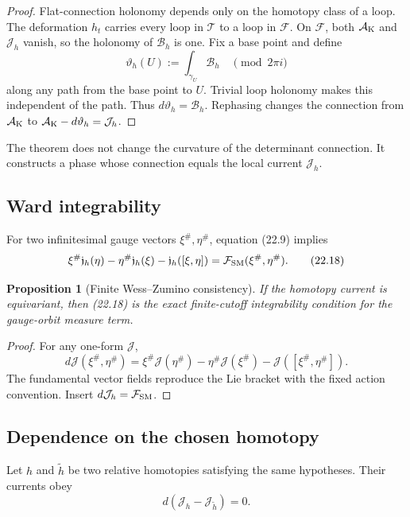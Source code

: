 \documentclass[11pt]{article}
\newtheorem{proposition}[theorem]{Proposition}
\begin{document}
\begin{proof}
Flat-connection holonomy depends only on the homotopy class of a loop.
The deformation \(h_t\) carries every loop in \(\mathcal T\) to a loop in
\(\mathcal F\).  On \(\mathcal F\), both
\(\mathcal A_{\rm K}\) and \(\mathcal J_h\) vanish, so the holonomy of
\(\mathcal B_h\) is one.  Fix a base point and define
\[
 \vartheta_h(U):=\int_{\gamma_U}\mathcal B_h
 \quad\pmod{2\pi i}
\]
along any path from the base point to \(U\).  Trivial loop holonomy makes
this independent of the path.  Thus \(d\vartheta_h=\mathcal B_h\).
Rephasing changes the connection from
\(\mathcal A_{\rm K}\) to
\(\mathcal A_{\rm K}-d\vartheta_h=\mathcal J_h\).
\end{proof}

The theorem does not change the curvature of the determinant connection.
It constructs a phase whose connection equals the local current
\(\mathcal J_h\).

\subsection{Ward integrability}

For two infinitesimal gauge vectors \(\xi^\#,\eta^\#\), equation (22.9)
implies
\[
 \xi^\#\mathfrak j_h(\eta)
 -\eta^\#\mathfrak j_h(\xi)
 -\mathfrak j_h([\xi,\eta])
 =
 \mathcal F_{\rm SM}(\xi^\#,\eta^\#).
 \tag{22.18}
\]

\begin{proposition}[Finite Wess--Zumino consistency]
\label{prop:v11v22-consistency}
If the homotopy current is equivariant, then (22.18) is the exact
finite-cutoff integrability condition for the gauge-orbit measure term.
\end{proposition}

\begin{proof}
For any one-form \(\mathcal J\),
\[
 d\mathcal J(\xi^\#,\eta^\#)
 =
 \xi^\#\mathcal J(\eta^\#)
 -\eta^\#\mathcal J(\xi^\#)
 -\mathcal J([\xi^\#,\eta^\#]).
\]
The fundamental vector fields reproduce the Lie bracket with the fixed
action convention.  Insert \(d\mathcal J_h=\mathcal F_{\rm SM}\).
\end{proof}

\subsection{Dependence on the chosen homotopy}

Let \(h\) and \(\widetilde h\) be two relative homotopies satisfying the
same hypotheses.  Their currents obey
\[
 d(\mathcal J_h-\mathcal J_{\widetilde h})=0.
 \tag{22.19}
\]
\end{document}

